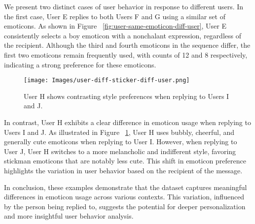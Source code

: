 We present two distinct cases of user behavior in response to different users. In the first case, User E replies to both Users F and G using a similar set of emoticons. As shown in Figure ~\ref{fig:user-same-emoticon-diff-user}, User E consistently selects a boy emoticon with a nonchalant expression, regardless of the recipient. Although the third and fourth emoticons in the sequence differ, the first two emoticons remain frequently used, with counts of 12 and 8 respectively, indicating a strong preference for these emoticons.

\begin{figure}[htbp] \centering \texttt{[image: Images/user-diff-sticker-diff-user.png]} \caption{User H shows contrasting style preferences when replying to Users I and J.} \label{fig:user-diff-emoticon-diff-user} \end{figure}

In contrast, User H exhibits a clear difference in emoticon usage when replying to Users I and J. As illustrated in Figure ~\ref{fig:user-diff-emoticon-diff-user}, User H uses bubbly, cheerful, and generally cute emoticons when replying to User I. However, when replying to User J, User H switches to a more melancholic and indifferent style, favoring stickman emoticons that are notably less cute. This shift in emoticon preference highlights the variation in user behavior based on the recipient of the message.

In conclusion, these examples demonstrate that the dataset captures meaningful differences in emoticon usage across various contexts. This variation, influenced by the person being replied to, suggests the potential for deeper personalization and more insightful user behavior analysis.

